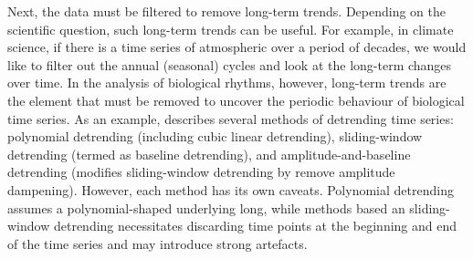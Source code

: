 Next, the data must be filtered to remove long-term trends.
Depending on the scientific question, such long-term trends can be useful.
For example, in climate science, if there is a time series of atmospheric  over a period of decades, we would like to filter out the annual (seasonal) cycles and look at the long-term changes over time.
In the analysis of biological rhythms, however, long-term trends are the element that must be removed to uncover the periodic behaviour of biological time series.
As an example, \textcite{zielinskiPeriodEstimationRhythm2022} describes several methods of detrending time series: polynomial detrending (including cubic linear detrending), sliding-window detrending (termed as baseline detrending), and amplitude-and-baseline detrending (modifies sliding-window detrending by remove amplitude dampening).
However, each method has its own caveats.
Polynomial detrending assumes a polynomial-shaped underlying long, while methods based an sliding-window detrending necessitates discarding time points at the beginning and end of the time series and may introduce strong artefacts.

